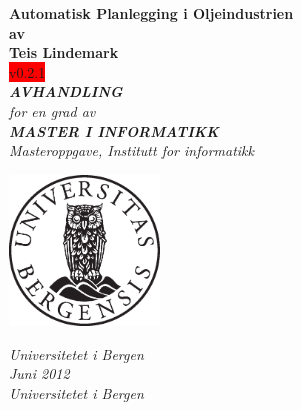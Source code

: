 \documentclass[12pt,twoside,norsk,onecolumn]{article}
\begin{document}
\newcommand{\versjon}{v0.2.1}

\thispagestyle{empty}
\begin{center}        %
  \vspace{5mm}          %
  \LARGE
  \textbf{Automatisk Planlegging i Oljeindustrien} \\
  \Large
  \vspace{5mm}
  \textbf{av} \\
  \vspace{5mm}
  \large
  \textbf{Teis Lindemark} \\
  \colorbox{red}{\versjon} \\
  \vspace{30mm}
  \Large
  {\bf{\textsl{AVHANDLING}}} \\
  \textsl{for en grad av} \\
  \vspace{2mm}
  {\bf{\textsl{MASTER I INFORMATIKK}}} \\
  \vspace{5mm}
  {\large \textsl {Masteroppgave, Institutt for informatikk}}\\
  \vspace{10mm}
  \centerline{\includegraphics[width=4cm,height=4cm]{uibugle}}
  \vspace{5mm}
  \textsl{Universitetet i Bergen} \\
  \vspace{10mm}
  \large
  \textsl{Juni 2012} \\
  \vspace{5mm}
  \normalsize
  \textsl{Universitetet i Bergen} \\
\end{center}
\newpage
\end{document}
